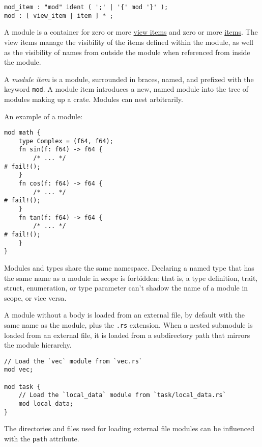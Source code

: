 \documentclass[]{article}
\begin{document}

\begin{verbatim}
mod_item : "mod" ident ( ';' | '{' mod '}' );
mod : [ view_item | item ] * ;
\end{verbatim}

A module is a container for zero or more \hyperref[view-items]{view
items} and zero or more \hyperref[items]{items}. The view items manage
the visibility of the items defined within the module, as well as the
visibility of names from outside the module when referenced from inside
the module.

A \emph{module item} is a module, surrounded in braces, named, and
prefixed with the keyword \texttt{mod}. A module item introduces a new,
named module into the tree of modules making up a crate. Modules can
nest arbitrarily.

An example of a module:

\begin{verbatim}
mod math {
    type Complex = (f64, f64);
    fn sin(f: f64) -> f64 {
        /* ... */
# fail!();
    }
    fn cos(f: f64) -> f64 {
        /* ... */
# fail!();
    }
    fn tan(f: f64) -> f64 {
        /* ... */
# fail!();
    }
}
\end{verbatim}

Modules and types share the same namespace. Declaring a named type that
has the same name as a module in scope is forbidden: that is, a type
definition, trait, struct, enumeration, or type parameter can't shadow
the name of a module in scope, or vice versa.

A module without a body is loaded from an external file, by default with
the same name as the module, plus the \texttt{.rs} extension. When a
nested submodule is loaded from an external file, it is loaded from a
subdirectory path that mirrors the module hierarchy.

\begin{verbatim}
// Load the `vec` module from `vec.rs`
mod vec;

mod task {
    // Load the `local_data` module from `task/local_data.rs`
    mod local_data;
}
\end{verbatim}

The directories and files used for loading external file modules can be
influenced with the \texttt{path} attribute.
\end{document}
